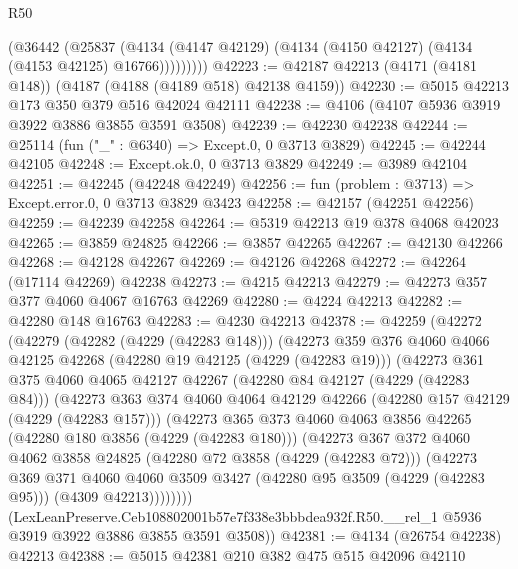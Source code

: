 \begin{lexlean}{R50}
\begin{coremodule}
            (@36442
              (@25837
                (@4134 (@4147 @42129) (@4134 (@4150 @42127) (@4134 (@4153 @42125) @16766)))))))))
@42223 := @42187 @42213 (@4171 (@4181 @148)) (@4187 (@4188 (@4189 @518) @42138 @4159))
@42230 := @5015 @42213 @173 @350 @379 @516 @42024 @42111
@42238 := @4106 (@4107 @5936 @3919 @3922 @3886 @3855 @3591 @3508)
@42239 := @42230 @42238
@42244 := @25114 (fun ("_" : @6340) => Except.{0, 0} @3713 @3829)
@42245 := @42244 @42105
@42248 := Except.ok.{0, 0} @3713 @3829
@42249 := @3989 @42104
@42251 := @42245 (@42248 @42249)
@42256 := fun (problem : @3713) => Except.error.{0, 0} @3713 @3829 @3423
@42258 := @42157 (@42251 @42256)
@42259 := @42239 @42258
@42264 := @5319 @42213 @19 @378 @4068 @42023
@42265 := @3859 @24825
@42266 := @3857 @42265
@42267 := @42130 @42266
@42268 := @42128 @42267
@42269 := @42126 @42268
@42272 := @42264 (@17114 @42269) @42238
@42273 := @4215 @42213
@42279 := @42273 @357 @377 @4060 @4067 @16763 @42269
@42280 := @4224 @42213
@42282 := @42280 @148 @16763
@42283 := @4230 @42213
@42378 := @42259
    (@42272
      (@42279
        (@42282 (@4229 (@42283 @148)))
        (@42273
          @359
          @376
          @4060
          @4066
          @42125
          @42268
          (@42280 @19 @42125 (@4229 (@42283 @19)))
          (@42273
            @361
            @375
            @4060
            @4065
            @42127
            @42267
            (@42280 @84 @42127 (@4229 (@42283 @84)))
            (@42273
              @363
              @374
              @4060
              @4064
              @42129
              @42266
              (@42280 @157 @42129 (@4229 (@42283 @157)))
              (@42273
                @365
                @373
                @4060
                @4063
                @3856
                @42265
                (@42280 @180 @3856 (@4229 (@42283 @180)))
                (@42273
                  @367
                  @372
                  @4060
                  @4062
                  @3858
                  @24825
                  (@42280 @72 @3858 (@4229 (@42283 @72)))
                  (@42273
                    @369
                    @371
                    @4060
                    @4060
                    @3509
                    @3427
                    (@42280 @95 @3509 (@4229 (@42283 @95)))
                    (@4309 @42213))))))))
      (LexLeanPreserve.Ceb108802001b57e7f338e3bbbdea932f.R50.__rel_1
        @5936
        @3919
        @3922
        @3886
        @3855
        @3591
        @3508))
@42381 := @4134 (@26754 @42238) @42213
@42388 := @5015 @42381 @210 @382 @475 @515 @42096 @42110

\end{coremodule}
\end{lexlean}
